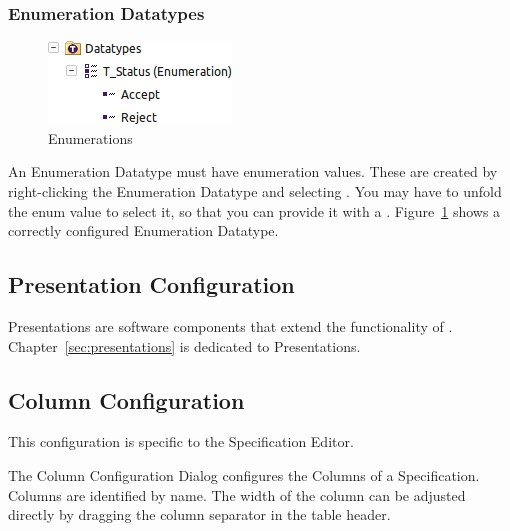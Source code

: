 \subsubsection{Enumeration Datatypes}

\begin{figure}
\centering      
\includegraphics[width=0.3\linewidth]{../rmf-images/rmf_enumeration.png}
\caption{Enumerations}      
\label{fig:Enumerations}
\end{figure}

An Enumeration Datatype must have enumeration values.  These are created
by right-clicking the Enumeration Datatype and selecting .  You may have to unfold the enum value to select it, so that you can provide it with a .  Figure~\ref{fig:Enumerations} shows a correctly configured Enumeration Datatype.

\subsection{Presentation Configuration}
\label{sec:presentation_configuration}

Presentations are software components that extend the functionality of \pror{}.  Chapter~\ref{sec:presentations} is dedicated to Presentations.

\subsection{Column Configuration}
\label{sec:column_configuration}

This configuration is specific to the Specification Editor.

The Column Configuration Dialog configures the Columns of a
Specification.  Columns are identified by name.  The width of the column
can be adjusted directly by dragging the column separator in the table
header.

